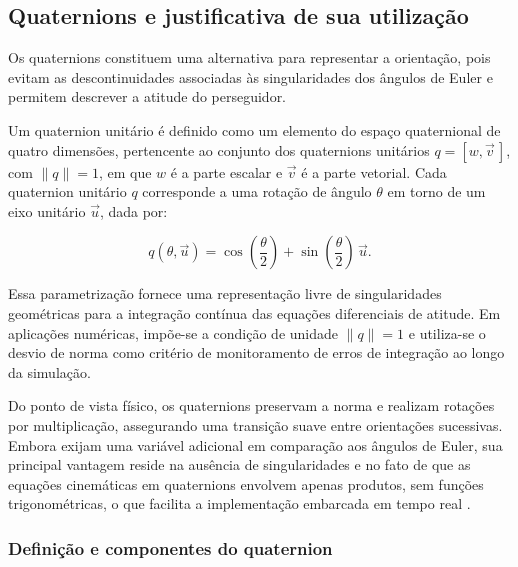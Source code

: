 \subsection{Quaternions e justificativa de sua utilização}
\label{sec:representacao_quaternion}
 
Os quaternions constituem uma alternativa para representar a orientação, pois evitam as descontinuidades associadas às singularidades dos ângulos de Euler e permitem descrever a atitude do perseguidor.

Um quaternion unitário é definido como um elemento do espaço quaternional de quatro dimensões, pertencente ao conjunto
dos quaternions unitários $q = [w,\vec{v}\,]$, com $\|q\| = 1$, em que $w$ é a parte escalar e $\vec{v}$ é a parte vetorial. Cada quaternion unitário $q$ corresponde a uma rotação de ângulo $\theta$ em torno de um eixo unitário $\vec{u}$, dada por:

\begin{equation}
q(\theta,\vec{u}) = \cos\!\left(\frac{\theta}{2}\right) + \sin\!\left(\frac{\theta}{2}\right)\,\vec{u}.
\label{eq_quat_axis_angle}
\end{equation}

Essa parametrização fornece uma representação livre de singularidades geométricas para a integração contínua das equações diferenciais de atitude.
Em aplicações numéricas, impõe-se a condição de unidade $\|q\|=1$ e utiliza-se o desvio de norma como critério de monitoramento de erros de integração ao longo da simulação.

Do ponto de vista físico, os quaternions preservam a norma e realizam rotações por multiplicação, assegurando uma transição suave entre orientações sucessivas.
Embora exijam uma variável adicional em comparação aos ângulos de Euler, sua principal vantagem reside na ausência de singularidades e no fato de que as equações cinemáticas em quaternions envolvem apenas produtos, sem funções trigonométricas, o que facilita a implementação embarcada em tempo real \cite{wie2008space}.

\subsubsection{Definição e componentes do quaternion}
\label{sec:componentes_quaternion}

